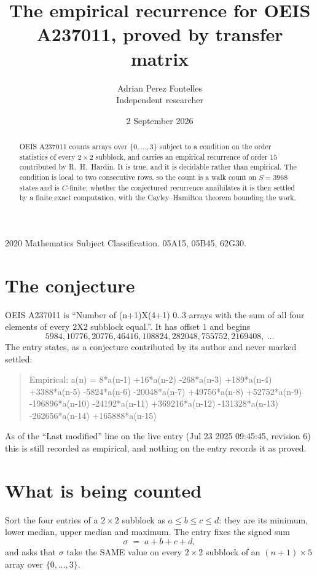 \documentclass[11pt,a4paper]{article}
\title{The empirical recurrence for OEIS A237011, proved by transfer matrix}
\author{Adrian Perez Fontelles\\ \small Independent researcher}
\date{2 September 2026}
\theoremstyle{plain}
\theoremstyle{definition}
\begin{document}
\maketitle

\begin{abstract}
OEIS A237011 counts arrays over $\{0,\dots,3\}$ subject to a condition on the order
statistics of every $2\times2$ subblock, and carries an empirical recurrence of order
$15$ contributed by R.~H.~Hardin. It is true, and it is decidable rather than empirical.
The condition is local to two consecutive rows, so the count is a walk count on $S=3968$
states and is $C$-finite; whether the conjectured recurrence annihilates it is then settled by
a finite exact computation, with the Cayley--Hamilton theorem bounding the work.
\end{abstract}

\noindent\small 2020 Mathematics Subject Classification. 05A15, 05B45, 62G30.\normalsize

\section{The conjecture}

OEIS A237011 is ``Number of (n+1)X(4+1) 0..3 arrays with the sum of all four elements of every 2X2 subblock equal.''. It has offset $1$ and begins
\[
5984, 10776, 20776, 46416, 108824, 282048, 755752, 2169408,\ \dots
\]
The entry states, as a conjecture contributed by its author and never marked settled:
\begin{quote}
Empirical: a(n) = 8*a(n-1) +16*a(n-2) -268*a(n-3) +189*a(n-4) +3388*a(n-5) -5824*a(n-6) -20048*a(n-7) +49756*a(n-8) +52752*a(n-9) -196896*a(n-10) -24192*a(n-11) +369216*a(n-12) -131328*a(n-13) -262656*a(n-14) +165888*a(n-15)
\end{quote}
As of the ``Last modified'' line on the live entry (Jul 23 2025 09:45:45, revision 6) this is still
recorded as empirical, and nothing on the entry records it as proved.

\section{What is being counted}

Sort the four entries of a $2\times2$ subblock as $a\le b\le c\le d$: they
are its minimum, lower median, upper median and maximum. The entry fixes the signed sum
\[
\sigma\;=\;a+b+c+d,
\]
and asks that $\sigma$ take the SAME value on every $2\times2$ subblock of an
$(n+1)\times5$ array over $\{0,\dots,3\}$.
\end{document}
